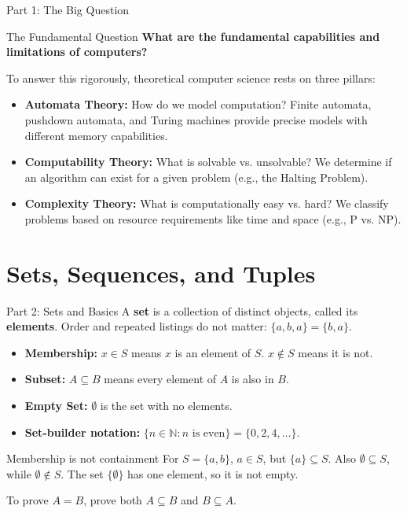 \documentclass[10pt]{beamer}
\begin{document}
\begin{frame}{Part 1: The Big Question}
  \small
  \begin{block}{The Fundamental Question}
    \textbf{What are the fundamental capabilities and limitations of computers?}
  \end{block}
  \pause
  \vspace{0.5cm}
  To answer this rigorously, theoretical computer science rests on three pillars:
  \pause
  \begin{itemize}
      \item \textbf{Automata Theory:} How do we model computation? Finite
        automata, pushdown automata, and Turing machines provide precise
        models with different memory capabilities.
      \pause
      \item \textbf{Computability Theory:} What is solvable vs. unsolvable? We determine if an algorithm can exist for a given problem (e.g., the Halting Problem).
      \pause
      \item \textbf{Complexity Theory:} What is computationally easy vs. hard? We classify problems based on resource requirements like time and space (e.g., P vs. NP).
  \end{itemize}
\end{frame}

\section{Sets, Sequences, and Tuples}

\begin{frame}{Part 2: Sets and Basics}
  \small
  A \textbf{set} is a collection of distinct objects, called its
  \textbf{elements}. Order and repeated listings do not matter:
  $\{a,b,a\}=\{b,a\}$.
  \pause
  \begin{itemize}
      \item \textbf{Membership:} $x \in S$ means $x$ is an element of $S$. $x \notin S$ means it is not.
      \item \textbf{Subset:} $A \subseteq B$ means every element of $A$ is also in $B$.
      \item \textbf{Empty Set:} $\emptyset$ is the set with no elements.
      \item \textbf{Set-builder notation:}
        $\{n\in\mathbb{N}:n\text{ is even}\}=\{0,2,4,\ldots\}$.
  \end{itemize}
  \pause
  
  \begin{alertblock}{Membership is not containment}
    For $S=\{a,b\}$, $a\in S$, but $\{a\}\subseteq S$.
    Also $\emptyset\subseteq S$, while $\emptyset\notin S$.
    The set $\{\emptyset\}$ has one element, so it is not empty.
    \par\smallskip
    To prove $A=B$, prove both $A\subseteq B$ and $B\subseteq A$.
  \end{alertblock}
\end{frame}
\end{document}
